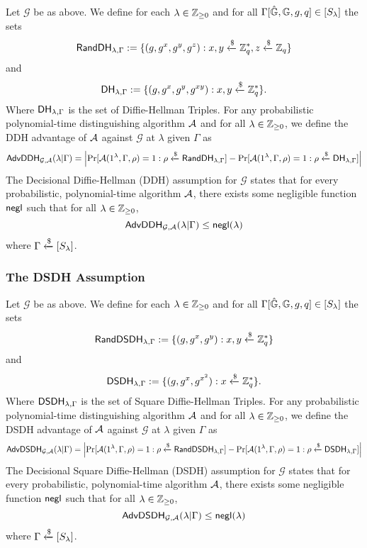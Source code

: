 Let $\mathcal{G}$ be as above. We define for each $\lambda\in\mathbb{Z}_{\geq 0}$ and for all $\Gamma[\hat{\mathbb{G}}, \mathbb{G}, g, q]\in[S_\lambda]$ the sets 
\begin{equation*}
	\mathsf{RandDH}_{\lambda,\Gamma} := \{(g, g^x, g^y, g^{z}) : x,y\xleftarrow{\$}\mathbb{Z}_q^{*}, z\xleftarrow{\$}\mathbb{Z}_q\}
\end{equation*}
and
\begin{equation*}
	\mathsf{DH}_{\lambda,\Gamma} := \{(g, g^x, g^y, g^{xy}) : x,y\xleftarrow{\$}\mathbb{Z}_q^{*}\}.
\end{equation*}
Where $\mathsf{DH}_{\lambda,\Gamma}$ is the set of Diffie-Hellman Triples. For any probabilistic polynomial-time distinguishing algorithm $\mathcal{A}$ and for all $\lambda\in\mathbb{Z}_{\geq 0}$, we define the DDH advantage of $\mathcal{A}$ against $\mathcal{G}$ at $\lambda$ given $\Gamma$ as
\begin{equation*}
	\mathsf{AdvDDH}_{\mathcal{G},\mathcal{A}}(\lambda | \Gamma) = \left|\Pr[\mathcal{A}(1^\lambda,\Gamma,\rho) = 1 : \rho\xleftarrow{\$}\mathsf{RandDH}_{\lambda,\Gamma}] - \Pr[\mathcal{A}(1^\lambda,\Gamma,\rho) = 1 : \rho\xleftarrow{\$}\mathsf{DH}_{\lambda,\Gamma}]\right|
\end{equation*}
The Decisional Diffie-Hellman (DDH) assumption for $\mathcal{G}$ states that for every probabilistic, polynomial-time algorithm $\mathcal{A}$, there exists some negligible function $\mathsf{negl}$ such that for all $\lambda\in\mathbb{Z}_{\geq 0}$, $$\mathsf{AdvDDH}_{\mathcal{G},\mathcal{A}}(\lambda | \Gamma)\leq\mathsf{negl}(\lambda)$$ where $\Gamma\xleftarrow{\$}[S_\lambda]$.

\subsubsection{The DSDH Assumption}

Let $\mathcal{G}$ be as above. We define for each $\lambda\in\mathbb{Z}_{\geq 0}$ and for all $\Gamma[\hat{\mathbb{G}}, \mathbb{G}, g, q]\in[S_\lambda]$ the sets 
\begin{equation*}
	\mathsf{RandDSDH}_{\lambda,\Gamma} := \{(g, g^x, g^{y}) : x,y\xleftarrow{\$}\mathbb{Z}_q^{*}\}
\end{equation*}
and
\begin{equation*}
	\mathsf{DSDH}_{\lambda,\Gamma} := \{(g, g^x, g^{x^2}) : x\xleftarrow{\$}\mathbb{Z}_q^{*}\}.
\end{equation*}
Where $\mathsf{DSDH}_{\lambda,\Gamma}$ is the set of Square Diffie-Hellman Triples. For any probabilistic polynomial-time distinguishing algorithm $\mathcal{A}$ and for all $\lambda\in\mathbb{Z}_{\geq 0}$, we define the DSDH advantage of $\mathcal{A}$ against $\mathcal{G}$ at $\lambda$ given $\Gamma$ as
\begin{equation*}
	\mathsf{AdvDSDH}_{\mathcal{G},\mathcal{A}}(\lambda | \Gamma) = \left|\Pr[\mathcal{A}(1^\lambda,\Gamma,\rho) = 1 : \rho\xleftarrow{\$}\mathsf{RandDSDH}_{\lambda,\Gamma}] - \Pr[\mathcal{A}(1^\lambda,\Gamma,\rho) = 1 : \rho\xleftarrow{\$}\mathsf{DSDH}_{\lambda,\Gamma}]\right|
\end{equation*}
The Decisional Square Diffie-Hellman (DSDH) assumption for $\mathcal{G}$ states that for every probabilistic, polynomial-time algorithm $\mathcal{A}$, there exists some negligible function $\mathsf{negl}$ such that for all $\lambda\in\mathbb{Z}_{\geq 0}$, $$\mathsf{AdvDSDH}_{\mathcal{G},\mathcal{A}}(\lambda | \Gamma)\leq\mathsf{negl}(\lambda)$$ where $\Gamma\xleftarrow{\$}[S_\lambda]$.

